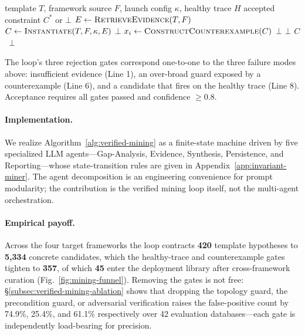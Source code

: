 \begin{algorithm}[t]
\caption{Counterexample-Guided Constraint Mining}
\label{alg:verified-mining}
\small
\begin{algorithmic}[1]
\REQUIRE template $T$, framework source $F$, launch config $\kappa$, healthy trace $H$
\ENSURE accepted constraint $C^\ast$ or $\bot$
\STATE $E \leftarrow \textsc{RetrieveEvidence}(T, F)$ 
\STATE $C \leftarrow \textsc{Instantiate}(T, F, \kappa, E)$ 
 \RETURN $\bot$ \ENDIF
{} 
  \STATE $x_i \leftarrow \textsc{ConstructCounterexample}(C)$
   \RETURN $\bot$  \ENDIF
\ENDFOR
{} \RETURN $\bot$  \ENDIF
{} \RETURN $C$ \ELSE\ \RETURN $\bot$ \ENDIF
\end{algorithmic}
\end{algorithm}

The loop's three rejection gates correspond one-to-one to the three failure modes above: insufficient evidence (Line 1), an over-broad guard exposed by a counterexample (Line 6), and a candidate that fires on the healthy trace (Line 8). Acceptance requires all gates passed and confidence $\geq 0.8$.

\paragraph{Implementation.} We realize Algorithm~\ref{alg:verified-mining} as a finite-state machine driven by five specialized LLM agents---Gap-Analysis, Evidence, Synthesis, Persistence, and Reporting---whose state-transition rules are given in Appendix~\ref{app:invariant-miner}. The agent decomposition is an engineering convenience for prompt modularity; the contribution is the verified mining loop itself, not the multi-agent orchestration.

\paragraph{Empirical payoff.} Across the four target frameworks the loop contracts \textbf{420} template hypotheses to \textbf{5{,}334} concrete candidates, which the healthy-trace and counterexample gates tighten to \textbf{357}, of which \textbf{45} enter the deployment library after cross-framework curation (Fig.~\ref{fig:mining-funnel}). Removing the gates is not free: \S\ref{subsec:verified-mining-ablation} shows that dropping the topology guard, the precondition guard, or adversarial verification raises the false-positive count by 74.9\%, 25.4\%, and 61.1\% respectively over 42 evaluation databases---each gate is independently load-bearing for precision.

